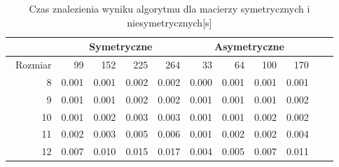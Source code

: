 \begin{table}
\centering
\begin{tabular}{|r|r|r|r|r|r|r|r|r|r|r|}
\hline
 & \multicolumn{4}{|c|}{Symetryczne} & \multicolumn{4}{|c|}{Asymetryczne} \\ \hline\
Rozmiar & 99 & 152 & 225 & 264 & 33 & 64 & 100 & 170 \\ \hline
8 & 0.001 & 0.001 & 0.002 & 0.002 & 0.000 & 0.001 & 0.001 & 0.001 \\
9 & 0.001 & 0.001 & 0.002 & 0.002 & 0.001 & 0.001 & 0.001 & 0.002 \\
10 & 0.001 & 0.002 & 0.003 & 0.003 & 0.001 & 0.001 & 0.002 & 0.002 \\
11 & 0.002 & 0.003 & 0.005 & 0.006 & 0.001 & 0.002 & 0.002 & 0.004 \\
12 & 0.007 & 0.010 & 0.015 & 0.017 & 0.004 & 0.005 & 0.007 & 0.011 \\ \hline
\end{tabular}
\caption{Czas znalezienia wyniku algorytmu dla macierzy symetrycznych i niesymetrycznych[s]}
\label{tab:time_AnAlpha}
\end{table}
